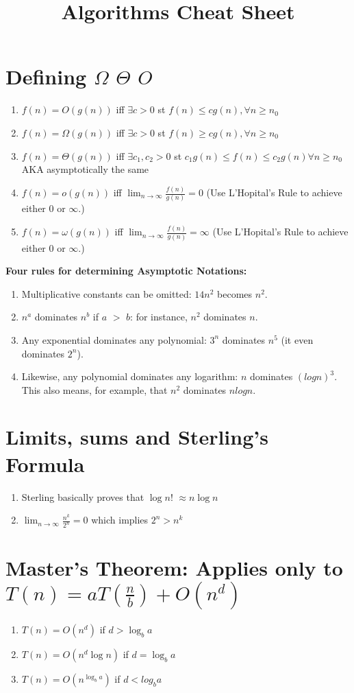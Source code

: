 \documentclass{article}
\begin{document}
\begin{center}
\title{Algorithms Cheat Sheet}
\end{center}

\section*{Defining $\Omega$ $\Theta$ $O$}
\begin{enumerate}
	\item $f(n)=O(g(n))$ iff $\exists c>0$ st $f(n) \leq cg(n), \forall n\geq n_0$
	\item $f(n)=\Omega(g(n))$ iff $\exists c>0$ st $f(n) \geq cg(n), \forall n\geq n_0$
    \item $f(n)=\Theta(g(n))$ iff $\exists c_1, c_2 > 0$ st $c_1g(n)\leq f(n) \leq c_2g(n) \forall n\geq n_0$  AKA asymptotically the same
	\item $f(n)=o(g(n))$ iff $\lim_{n\to \infty}\frac{f(n)}{g(n)}=0$ (Use L'Hopital's Rule to achieve either 0 or $\infty$.)
    \item $f(n)=\omega(g(n))$ iff $\lim_{n\to \infty}\frac{f(n)}{g(n)}=\infty$ (Use L'Hopital's Rule to achieve either 0 or $\infty$.)
\end{enumerate}

\textbf{Four rules for determining Asymptotic Notations:}
\begin{enumerate}
	\item Multiplicative constants can be omitted: $14n^2$ becomes $n^2$.
    \item $n^a$ dominates $n^b$ if $a$ $>$ $b$: for instance, $n^2$ dominates $n$.
    \item Any exponential dominates any polynomial: $3^n$ dominates $n^5$ (it even dominates 		$2^n$).
    \item Likewise, any polynomial dominates any logarithm: $n$ dominates $(log n)^3$. This
		also means, for example, that $n^2$ dominates $nlog n$.
\end{enumerate}	
\section*{Limits, sums and Sterling's Formula}
\begin{enumerate}
	\item Sterling basically proves that $\log{n!}$ $\approx n\log{n}$
    \item $\lim_{n\to \infty} \frac{n^k}{2^n}=0$ which implies $2^n>n^k$
\end{enumerate}
\section*{Master's Theorem: Applies only to $T(n)=aT(\frac{n}{b})+O(n^d)$}
	\begin{enumerate}
	\item $T(n)=O(n^d)$ if $d>\log_{b}a$
    \item $T(n)=O(n^{d}\log{n})$ if $d=\log_b{a}$
    \item $T(n)=O(n^{\log_b{a}})$ if $d<log_b{a}$
	\end{enumerate}
\end{document}
